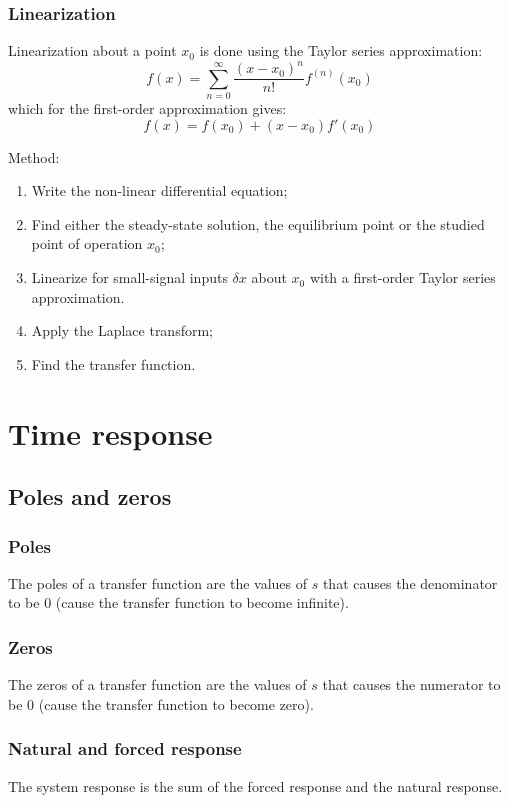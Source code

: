 \documentclass[10pt, twocolumn]{article}
\begin{document}
\subsubsection{Linearization}
Linearization about a point \(x_0\) is done using the Taylor series approximation:
\[
  f(x) = \sum_{n = 0}^{\infty}{\frac{(x - x_0)^n}{n!} f^{(n)}(x_0)}
\]
which for the first-order approximation gives:
\[
  f(x) = f(x_0) + (x - x_0) f'(x_0)
\]


Method:
\begin{enumerate}
  \item Write the non-linear differential equation;
  \item Find either the steady-state solution, the equilibrium point or the studied point of operation \(x_0\);
  \item Linearize for small-signal inputs \(\delta x\) about \(x_0\) with a first-order Taylor series approximation.
  \item Apply the Laplace transform;
  \item Find the transfer function.
\end{enumerate}


\section{Time response}
\subsection{Poles and zeros}
\subsubsection{Poles}
The poles of a transfer function are the values of \(s\) that causes the denominator to be 0 (cause the transfer function to become infinite).


\subsubsection{Zeros}
The zeros of a transfer function are the values of \(s\) that causes the numerator to be 0  (cause the transfer function to become zero).


\subsubsection{Natural and forced response}
The system response is the sum of the forced response and the natural response.
\end{document}
